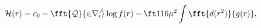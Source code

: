 \begin{equation}
{\cal H}(r)=c_0-\fft{\cal Q}{2r_0^6}\log f(r)-\ft1{16}\mu^2\int
\fft{d(r^2)}{g(r)},
\end{equation}

